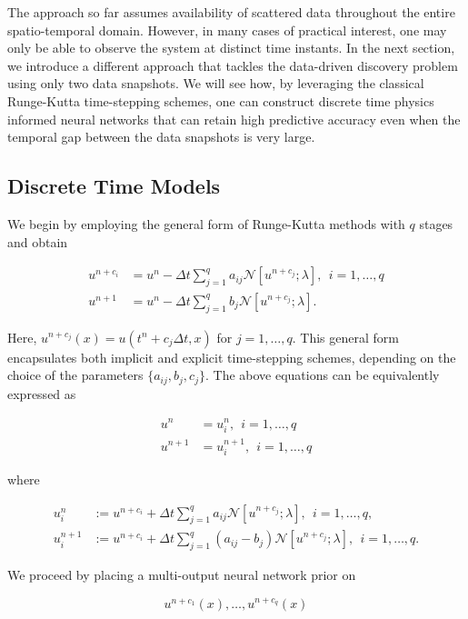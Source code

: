 \documentclass[book.tex]{subfiles}
\begin{document}
The approach so far assumes availability of scattered data throughout the entire spatio-temporal domain. However, in many cases of practical interest, one may only be able to observe the system at distinct time instants. In the next section, we introduce a different approach that tackles the data-driven discovery problem using only two data snapshots. We will see how, by leveraging the classical Runge-Kutta time-stepping schemes, one can construct discrete time physics informed neural networks that can retain high predictive accuracy even when the temporal gap between the data snapshots is very large.


\subsection{Discrete Time Models}

We begin by employing the general form of Runge-Kutta methods with $q$ stages and obtain

\begin{align}
u^{n+c_i} &= u^n - \Delta t \sum_{j=1}^q a_{ij} \mathcal{N}[u^{n+c_j};\lambda], \ \ i=1,\ldots,q\\
u^{n+1} &= u^{n} - \Delta t \sum_{j=1}^q b_j \mathcal{N}[u^{n+c_j};\lambda].        
\end{align}


Here, $u^{n+c_j}(x) = u(t^n + c_j \Delta t, x)$ for $j=1, \ldots, q$. This general form encapsulates both implicit and explicit time-stepping schemes, depending on the choice of the parameters $\{a_{ij},b_j,c_j\}$. The above equations can be equivalently expressed as

\begin{align}
u^{n} &= u^n_i, \ \ i=1,\ldots,q\\
u^{n+1} &= u^{n+1}_{i}, \ \ i=1,\ldots,q
\end{align}

where

\begin{align}
u^n_i &:= u^{n+c_i} + \Delta t \sum_{j=1}^q a_{ij} \mathcal{N}[u^{n+c_j};\lambda], \ \ i=1,\ldots,q,\\
u^{n+1}_{i} &:= u^{n+c_i} + \Delta t \sum_{j=1}^q (a_{ij} - b_j) \mathcal{N}[u^{n+c_j};\lambda], \ \ i=1,\ldots,q.
\end{align}



We proceed by placing a multi-output neural network prior on

\begin{equation}
u^{n+c_1}(x), \ldots, u^{n+c_q}(x)    
\end{equation}
\end{document}
